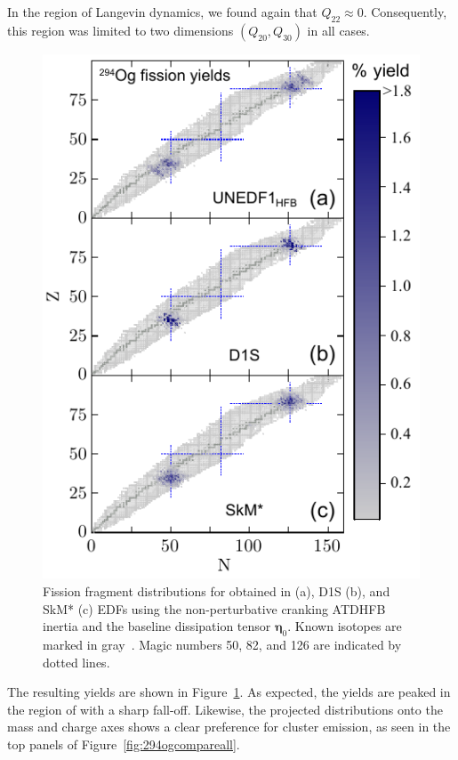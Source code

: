 In the region of Langevin dynamics, we found again that $Q_{22} \approx 0$. Consequently, this region was limited to two dimensions $(Q_{20}, Q_{30})$ in all cases.

\begin{figure}
	\centering
	\includegraphics[width=0.9\linewidth]{TeX_files/294Og_3yields}
	\caption[N-Z fission fragment yields from $^{294}$Og]{Fission fragment distributions for \Og{} obtained in \hfb{} (a), D1S (b), and SkM* (c) EDFs using the non-perturbative cranking ATDHFB inertia and  the baseline  dissipation tensor $\mathbf{\eta}_0$. Known isotopes are marked in gray~\cite{NuDat}. Magic numbers 50, 82, and 126 are indicated by dotted lines.}
	\label{fig:294og3yields}
\end{figure}

The resulting yields are shown in Figure~\ref{fig:294og3yields}. As expected, the yields are peaked in the region of {\Pb} with a sharp fall-off. Likewise, the projected distributions onto the mass and charge axes shows a clear preference for cluster emission, as seen in the top panels of Figure~\ref{fig:294ogcompareall}.

